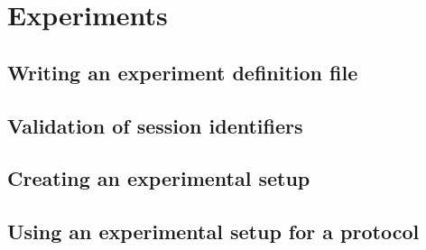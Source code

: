 \chapter{Experiments}
\label{ch:Experiments}

\section{Writing an experiment definition file}
\label{sec:expxFiles}

\section{Validation of session identifiers}
\label{sec:ValidationOfIDs}

\section{Creating an experimental setup}
\label{sec:ExperimentalSetup}

\section{Using an experimental setup for a protocol}
\label{sec:UsingExperimentalSetups}